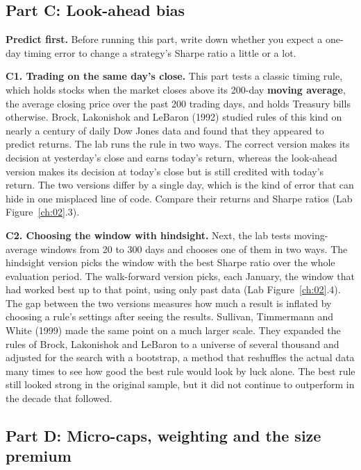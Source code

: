 \subsection*{Part C: Look-ahead bias}

\textbf{Predict first.} Before running this part, write down whether you expect a one-day timing error to change a strategy's Sharpe ratio a little or a lot.

\textbf{C1. Trading on the same day's close.} This part tests a classic timing rule, which holds stocks when the market closes above its 200-day \textbf{moving average}, the average closing price over the past 200 trading days, and holds Treasury bills otherwise. Brock, Lakonishok and LeBaron (1992) studied rules of this kind on nearly a century of daily Dow Jones data and found that they appeared to predict returns. The lab runs the rule in two ways. The correct version makes its decision at yesterday's close and earns today's return, whereas the look-ahead version makes its decision at today's close but is still credited with today's return. The two versions differ by a single day, which is the kind of error that can hide in one misplaced line of code. Compare their returns and Sharpe ratios (Lab Figure~\ref{ch:02}.3).

\textbf{C2. Choosing the window with hindsight.} Next, the lab tests moving-average windows from 20 to 300 days and chooses one of them in two ways. The hindsight version picks the window with the best Sharpe ratio over the whole evaluation period. The walk-forward version picks, each January, the window that had worked best up to that point, using only past data (Lab Figure~\ref{ch:02}.4). The gap between the two versions measures how much a result is inflated by choosing a rule's settings after seeing the results. Sullivan, Timmermann and White (1999) made the same point on a much larger scale. They expanded the rules of Brock, Lakonishok and LeBaron to a universe of several thousand and adjusted for the search with a bootstrap, a method that reshuffles the actual data many times to see how good the best rule would look by luck alone. The best rule still looked strong in the original sample, but it did not continue to outperform in the decade that followed.

\subsection*{Part D: Micro-caps, weighting and the size premium}

